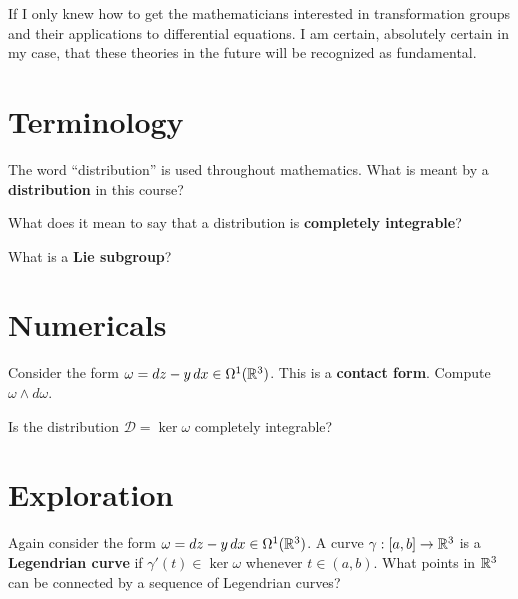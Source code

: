 \documentclass{homework}
\author{Jim Fowler}
\begin{document}
\maketitle

\begin{inspiration} If I only knew how to get the mathematicians
interested in transformation groups and their applications to
differential equations. I am certain, absolutely certain in my case,
that these theories in the future will be recognized as fundamental.
\end{inspiration}

\section{Terminology}

\begin{problem} The word ``distribution'' is used throughout
mathematics.  What is meant by a \textbf{distribution} in this course?
\end{problem}

\begin{problem} What does it mean to say that a distribution is
\textbf{completely integrable}?
\end{problem}

\begin{problem} What is a \textbf{Lie subgroup}?
\end{problem}

\section{Numericals}

\begin{problem} Consider the form $\omega = dz - y \, dx \in
\Omega^1(\mathbb{R}^3)$.  This is a \textbf{contact form}.  Compute $\omega
\wedge d\omega$.

  Is the distribution $\mathcal{D} = \ker \omega$ completely
integrable?
\end{problem}

\section{Exploration}

\begin{problem} Again consider the form $\omega = dz - y \, dx \in
\Omega^1(\mathbb{R}^3)$. A curve $\gamma : [a,b] \to \mathbb{R}^3$ is a
\textbf{Legendrian curve} if $\gamma'(t) \in \ker \omega$ whenever $t
\in (a,b)$. What points in $\mathbb{R}^3$ can be connected by a sequence of
Legendrian curves?
\end{problem}
\end{document}
